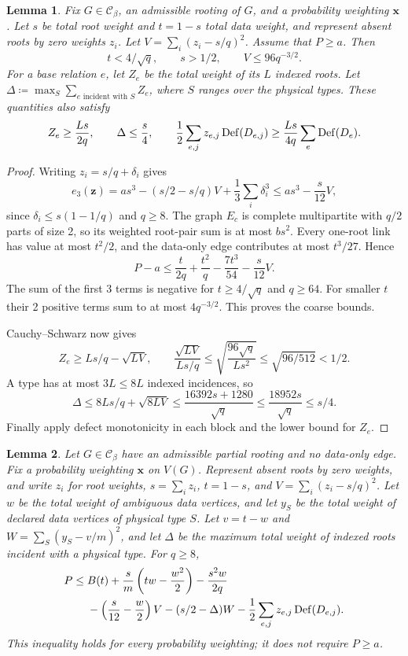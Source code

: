 \documentclass[10pt]{article}
\numberwithin{equation}{section}
\newtheorem{lemma}[lemma]{Lemma}\aliascntresetthe{lemma}
\theoremstyle{definition}
\newcommand{\x}{\boldsymbol{x}}\newcommand{\y}{\boldsymbol{y}}
\begin{document}
\begin{lemma}
\label{lem:wi-coarse-blocks}
Fix $G\in\mathcal C_\beta$, an admissible rooting of $G$, and a probability weighting $\x$. Let $s$ be total root weight and $t=1-s$ total data weight, and represent absent roots by zero weights $z_i$. Let $V=\sum_i(z_i-s/q)^2$. Assume that $P\ge a$. Then
\[
 t<4/\sqrt q,\qquad s>1/2,\qquad V\le96q^{-3/2}.
\]
For a base relation $e$, let $Z_e$ be the total weight of its $L$ indexed roots. Let $\Delta\coloneqq\max_S\sum_{e\text{ incident with }S}Z_e$, where $S$ ranges over the physical types. These quantities also satisfy
\[
 Z_e\ge\frac{Ls}{2q},\qquad \Delta\le\frac s4,
 \qquad
 \frac12\sum_{e,j}z_{e,j}\operatorname{Def}(D_{e,j})
 \ge\frac{Ls}{4q}\sum_e\operatorname{Def}(D_e).
\]
\end{lemma}
\begin{proof}
Writing $z_i=s/q+\delta_i$ gives
\[
 e_3(\boldsymbol z)
 =as^3-(s/2-s/q)V+\frac13\sum_i\delta_i^3
 \le as^3-\frac{s}{12}V,
\]
since $\delta_i\le s(1-1/q)$ and $q\ge8$. The graph $E_c$ is complete multipartite with $q/2$ parts of size 2, so its weighted root-pair sum is at most $bs^2$. Every one-root link has value at most $t^2/2$, and the data-only edge contributes at most $t^3/27$. Hence
\[
 P-a\le\frac{t}{2q}+\frac{t^2}{q}-\frac{7t^3}{54}
                -\frac{s}{12}V.
\]
The sum of the first 3 terms is negative for $t\ge4/\sqrt q$ and $q\ge64$. For smaller $t$ their 2 positive terms sum to at most $4q^{-3/2}$. This proves the coarse bounds.

Cauchy--Schwarz now gives
\[
 Z_e\ge Ls/q-\sqrt{LV},\qquad
 \frac{\sqrt{LV}}{Ls/q}
 \le\sqrt{\frac{96\sqrt q}{Ls^2}}
 \le\sqrt{96/512}<1/2.
\]
A type has at most $3L\le8L$ indexed incidences, so
\[
 \Delta\le8Ls/q+\sqrt{8LV}
 \le\frac{16392s+1280}{\sqrt q}
 \le\frac{18952s}{\sqrt q}\le s/4.
\]
Finally apply defect monotonicity in each block and the lower bound for $Z_e$.
\end{proof}
\begin{lemma}
\label{lem:no-ddd-unmarked-weighted-estimate}
Let $G\in\mathcal C_\beta$ have an admissible partial rooting and no data-only edge. Fix a probability weighting $\x$ on $V(G)$. Represent absent roots by zero weights, and write $z_i$ for root weights, $s=\sum_i z_i$, $t=1-s$, and $V=\sum_i(z_i-s/q)^2$. Let $w$ be the total weight of ambiguous data vertices, and let $y_S$ be the total weight of declared data vertices of physical type $S$. Let $v=t-w$ and $W=\sum_S(y_S-v/m)^2$, and let $\Delta$ be the maximum total weight of indexed roots incident with a physical type. For $q\ge8$,
\begin{align*}
 P\le{}& B(t)+\frac{s}{m}\left(tw-\frac{w^2}{2}\right)
              -\frac{s^2w}{2q}\\
 &-\left(\frac{s}{12}-\frac w2\right)V
 -(s/2-\Delta)W
 -\frac12\sum_{e,j}z_{e,j}\operatorname{Def}(D_{e,j}).
\end{align*}
This inequality holds for every probability weighting; it does not require $P\ge a$.
\end{lemma}
\end{document}
